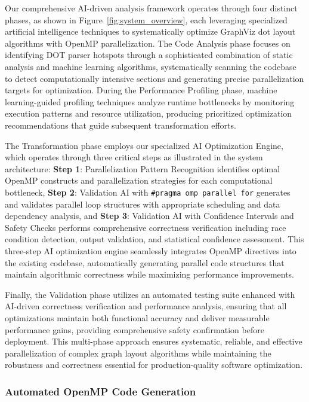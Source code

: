Our comprehensive AI-driven analysis framework operates through four distinct phases, as shown in Figure~\ref{fig:system_overview}, each leveraging specialized artificial intelligence techniques to systematically optimize GraphViz dot layout algorithms with OpenMP parallelization. The Code Analysis phase focuses on identifying DOT parser hotspots through a sophisticated combination of static analysis and machine learning algorithms, systematically scanning the codebase to detect computationally intensive sections and generating precise parallelization targets for optimization. During the Performance Profiling phase, machine learning-guided profiling techniques analyze runtime bottlenecks by monitoring execution patterns and resource utilization, producing prioritized optimization recommendations that guide subsequent transformation efforts. 

The Transformation phase employs our specialized AI Optimization Engine, which operates through three critical steps as illustrated in the system architecture: \textbf{Step 1}: Parallelization Pattern Recognition identifies optimal OpenMP constructs and parallelization strategies for each computational bottleneck, \textbf{Step 2}: Validation AI with \texttt{\#pragma omp parallel for} generates and validates parallel loop structures with appropriate scheduling and data dependency analysis, and \textbf{Step 3}: Validation AI with Confidence Intervals and Safety Checks performs comprehensive correctness verification including race condition detection, output validation, and statistical confidence assessment. This three-step AI optimization engine seamlessly integrates OpenMP directives into the existing codebase, automatically generating parallel code structures that maintain algorithmic correctness while maximizing performance improvements. 

Finally, the Validation phase utilizes an automated testing suite enhanced with AI-driven correctness verification and performance analysis, ensuring that all optimizations maintain both functional accuracy and deliver measurable performance gains, providing comprehensive safety confirmation before deployment. This multi-phase approach ensures systematic, reliable, and effective parallelization of complex graph layout algorithms while maintaining the robustness and correctness essential for production-quality software optimization.

\subsubsection{Automated OpenMP Code Generation}

